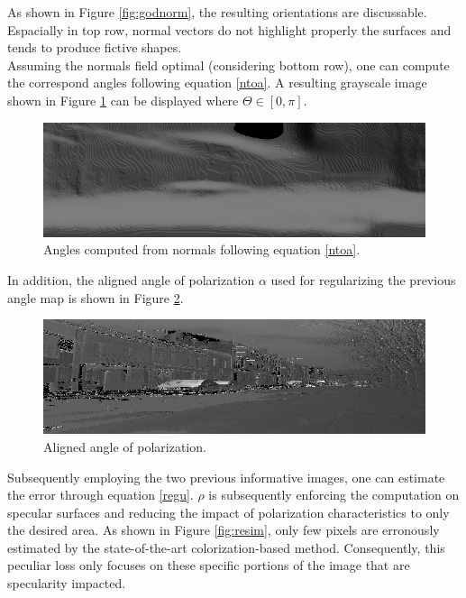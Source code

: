 As shown in Figure \ref{fig:godnorm}, the resulting orientations are discussable. Espacially in top row, normal vectors do not highlight properly the surfaces and tends to produce fictive shapes. \\
Assuming the normals field optimal (considering bottom row), one can compute the correspond angles following equation \ref{ntoa}. A resulting grayscale image shown in Figure \ref{fig:tan} can be displayed where $\Theta\in\left[0,\pi\right]$.

\begin{figure}[h]
	\centering
	\includegraphics[width=0.8\linewidth]{Figures/Fusion/tan}
	\caption[Angles computed from normals.]{Angles computed from normals following equation \ref{ntoa}.}
	\label{fig:tan}
\end{figure}

In addition, the aligned angle of polarization $\alpha$ used for regularizing the previous angle map is shown in Figure \ref{fig:angleofp}.

\begin{figure}[h]
	\centering
	\includegraphics[width=0.8\linewidth]{Figures/Fusion/angleofp}
	\caption{Aligned angle of polarization.}
	\label{fig:angleofp}
\end{figure}

Subsequently employing the two previous informative images, one can estimate the error through equation \ref{regu}. $\rho$ is subsequently enforcing the computation on specular surfaces and reducing the impact of polarization characteristics to only the desired area. As shown in Figure \ref{fig:resim}, only few pixels are erronously estimated by the state-of-the-art colorization-based method. Consequently, this peculiar loss only focuses on these specific portions of the image that are specularity impacted.

